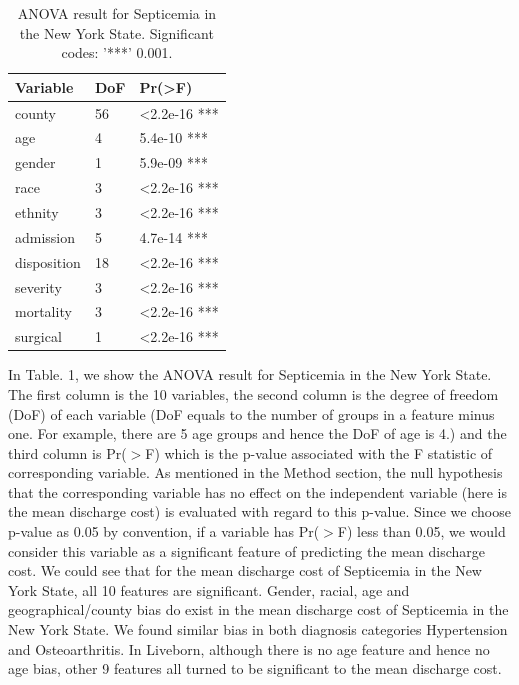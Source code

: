 \documentclass[10pt,twocolumn,letterpaper]{article}
\begin{document}
\begin{table}[]
\small
\begin{center}
\label{anova1}
\begin{tabular}{|l|l|l|}
\hline
\textbf{Variable} & \textbf{DoF} & \textbf{Pr(\textgreater{}F)} \\ \hline
county            & 56           & \textless{}2.2e-16 ***       \\ \hline
age               & 4            & 5.4e-10 ***                  \\ \hline
gender            & 1            & 5.9e-09 ***                  \\ \hline
race              & 3            & \textless{}2.2e-16 ***       \\ \hline
ethnity           & 3            & \textless{}2.2e-16 ***       \\ \hline
admission         & 5            & 4.7e-14 ***                  \\ \hline
disposition       & 18           & \textless{}2.2e-16 ***       \\ \hline
severity          & 3            & \textless{}2.2e-16 ***       \\ \hline
mortality         & 3            & \textless{}2.2e-16 ***       \\ \hline
surgical          & 1            & \textless{}2.2e-16 ***       \\ \hline
\end{tabular}
\end{center}
\caption{ANOVA result for Septicemia in the New York State. Significant codes: '***' 0.001.}
\end{table}
In Table. 1, we show the ANOVA result for Septicemia in the New York State. The first column is the 10 variables, the second column is the degree of freedom (DoF) of each variable (DoF equals to the number of groups in a feature minus one. For example, there are 5 age groups and hence the DoF of age is 4.) and the third column is Pr($>$F) which is the p-value associated with the F statistic of corresponding variable. As mentioned in the Method section, the null hypothesis that the corresponding variable has no effect on the independent variable (here is the mean discharge cost) is evaluated with regard to this p-value. Since we choose p-value as 0.05 by convention, if a variable has Pr($>$F) less than 0.05, we would consider this variable as a significant feature of predicting the mean discharge cost. We could see that for the mean discharge cost of Septicemia in the New York State, all 10 features are significant. Gender, racial, age and geographical/county bias do exist in the mean discharge cost of Septicemia in the New York State. We found similar bias in both diagnosis categories Hypertension and Osteoarthritis. In Liveborn, although there is no age feature and hence no age bias, other 9 features all turned to be significant to the mean discharge cost.
\end{document}
